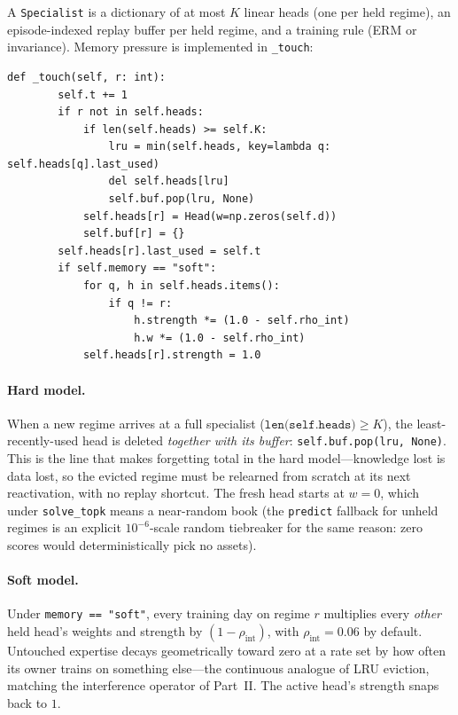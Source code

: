 \documentclass[11pt,a4paper]{article}
\theoremstyle{definition}
\theoremstyle{plain}
\begin{document}
A \texttt{Specialist} is a dictionary of at most $K$ linear heads (one per
held regime), an episode-indexed replay buffer per held regime, and a
training rule (ERM or invariance). Memory pressure is implemented in
\texttt{\_touch}:

\begin{lstlisting}[caption={Memory bookkeeping: hard LRU and soft interference (\texttt{risp.py}).},label={lst:dd6-touch}]
    def _touch(self, r: int):
        self.t += 1
        if r not in self.heads:
            if len(self.heads) >= self.K:
                lru = min(self.heads, key=lambda q: self.heads[q].last_used)
                del self.heads[lru]
                self.buf.pop(lru, None)
            self.heads[r] = Head(w=np.zeros(self.d))
            self.buf[r] = {}
        self.heads[r].last_used = self.t
        if self.memory == "soft":
            for q, h in self.heads.items():
                if q != r:
                    h.strength *= (1.0 - self.rho_int)
                    h.w *= (1.0 - self.rho_int)
            self.heads[r].strength = 1.0
\end{lstlisting}

\paragraph{Hard model.} When a new regime arrives at a full specialist
($\texttt{len(self.heads)} \ge K$), the least-recently-used head is deleted
\emph{together with its buffer}: \texttt{self.buf.pop(lru, None)}. This is
the line that makes forgetting total in the hard model---knowledge lost is
data lost, so the evicted regime must be relearned from scratch at its next
reactivation, with no replay shortcut. The fresh head starts at
$w = 0$, which under \texttt{solve\_topk} means a near-random book (the
\texttt{predict} fallback for unheld regimes is an explicit
$10^{-6}$-scale random tiebreaker for the same reason: zero scores would
deterministically pick no assets).

\paragraph{Soft model.} Under \texttt{memory == "soft"}, every training day
on regime $r$ multiplies every \emph{other} held head's weights and strength
by $(1 - \rho_{\mathrm{int}})$, with $\rho_{\mathrm{int}} = 0.06$ by
default. Untouched expertise decays geometrically toward zero at a rate set
by how often its owner trains on something else---the continuous analogue of
LRU eviction, matching the interference operator of Part~II. The active
head's strength snaps back to $1$.
\end{document}

